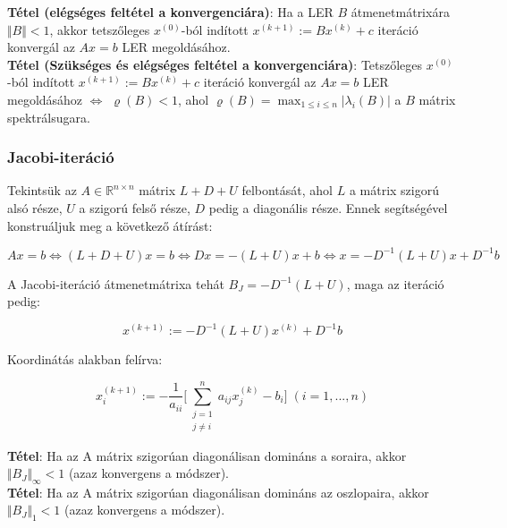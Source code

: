 \documentclass[margin=0px]{article}
\begin{document}
\noindent \textbf{Tétel (elégséges feltétel a konvergenciára)}: Ha a LER $B$ átmenetmátrixára $\Vert B \Vert < 1$,
akkor tetszőleges $x^{(0)}$-ból indított $x^{(k+1)} := Bx^{(k)} + c$ iteráció konvergál az $Ax = b$ LER megoldásához.\\

\noindent \textbf{Tétel (Szükséges és elégséges feltétel a konvergenciára)}: Tetszőleges $x^{(0)}$-ból indított
$x^{(k+1)} := Bx^{(k)} + c$ iteráció konvergál az $Ax = b$ LER megoldásához $\Longleftrightarrow$
$\varrho(B) < 1$, ahol $\varrho(B) = \max_{1 \leq i \leq n} |\lambda_{i}(B)|$ a $B$ mátrix spektrálsugara.

\subsubsection{Jacobi-iteráció}

Tekintsük az $A \in \mathbb{R}^{n \times n}$ mátrix $L + D + U$ felbontását, ahol $L$ a mátrix szigorú alsó része, $U$ a
szigorú felső része, $D$ pedig a diagonális része. Ennek segítségével konstruáljuk meg a következő átírást:

\begin{displaymath}
    Ax = b \Longleftrightarrow (L + D + U)x = b \Longleftrightarrow Dx = -(L+U)x+b \Longleftrightarrow
    x = -D^{-1}(L+U)x + D^{-1}b
\end{displaymath}

\noindent A Jacobi-iteráció átmenetmátrixa tehát $B_{J} = -D^{-1}(L + U)$, maga az iteráció pedig:

\begin{displaymath}
    x^{(k+1)} :=  -D^{-1}(L + U)x^{(k)} + D^{-1}b
\end{displaymath}

\noindent Koordinátás alakban felírva:

\begin{displaymath}
    x^{(k+1)}_{i} :=
    -\frac{1}{a_{ii}}
    \Bigg[
    \sum_{\substack{j=1\\ j \not = i}}^{n} a_{ij}x_{j}^{(k)} - b_{i}
    \Bigg]
    \; (i = 1, ..., n)
\end{displaymath}

\noindent \textbf{Tétel}: Ha az A mátrix szigorúan diagonálisan domináns a soraira, akkor
$\Vert B_{J} \Vert_{\infty} < 1$ (azaz konvergens a módszer).\\

\noindent \textbf{Tétel}: Ha az A mátrix szigorúan diagonálisan domináns az oszlopaira, akkor
$\Vert B_{J} \Vert_{1} < 1$ (azaz konvergens a módszer).
\end{document}
